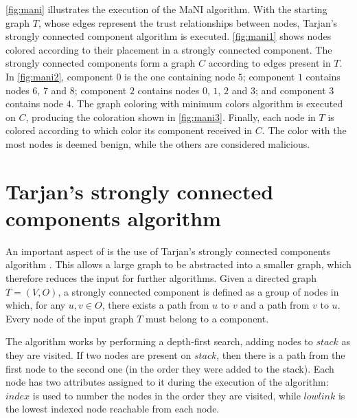 \autoref{fig:mani} illustrates the execution of the MaNI algorithm.
With the starting graph $T$, whose edges represent the trust relationships between nodes, Tarjan's strongly connected component algorithm is executed.
\autoref{fig:mani1} shows nodes colored according to their placement in a strongly connected component.
The strongly connected components form a graph $C$ according to edges present in $T$.
In \autoref{fig:mani2}, component $0$ is the one containing node $5$; component $1$ contains nodes $6$, $7$ and $8$; component $2$ contains nodes $0$, $1$, $2$ and $3$; and component $3$ contains node $4$.
The graph coloring with minimum colors algorithm is executed on $C$, producing the coloration shown in \autoref{fig:mani3}.
Finally, each node in $T$ is colored according to which color its component received in $C$.
The color with the most nodes is deemed benign, while the others are considered malicious. 


%
%
%
%

\section{Tarjan's strongly connected components algorithm}
\label{section:tarjan}
An important aspect of \cite{vernize2015malicious} is the use of Tarjan's strongly connected components algorithm \cite{tarjan1972depth}.
This allows a large graph to be abstracted into a smaller graph, which therefore reduces the input for further algorithms.
Given a directed graph $T = (V,O)$, a strongly connected component is defined as a group of nodes in which, for any $u, v \in O$, there exists a path from $u$ to $v$ and a path from $v$ to $u$.
Every node of the input graph $T$ must belong to a component.

The algorithm works by performing a depth-first search, adding nodes to $stack$ as they are visited.
If two nodes are present on $stack$, then there is a path from the first node to the second one (in the order they were added to the stack).
Each node has two attributes assigned to it during the execution of the algorithm: $index$ is used to number the nodes in the order they are visited, while $lowlink$ is the lowest indexed node reachable from each node.

